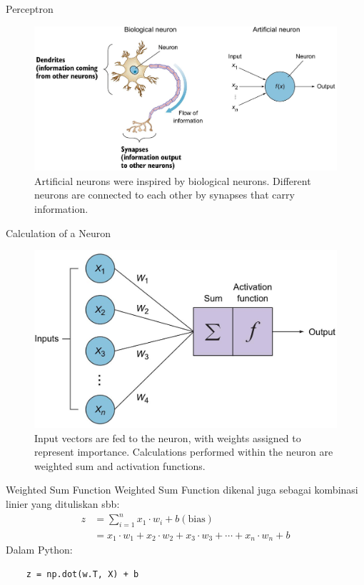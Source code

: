 \documentclass{beamer}
\begin{document}
\begin{frame}{Perceptron}
	\begin{figure}[ht]
		\centering
		\includegraphics[scale=0.2]{images/ann}
		\caption{Artificial neurons were inspired by biological neurons. Different neurons are connected to each other by synapses that carry information.}
	\end{figure}	
\end{frame}

\begin{frame}{Calculation of a Neuron}
	\begin{figure}[ht]
		\centering
		\includegraphics[scale=0.2]{images/calculation-perceptron}
		\caption{Input vectors are fed to the neuron, with weights assigned to represent importance. Calculations performed within the neuron are weighted sum and activation functions.}
	\end{figure}	
\end{frame}

\begin{frame}[fragile]{Weighted Sum Function}
	Weighted Sum Function dikenal juga sebagai kombinasi linier yang dituliskan sbb:
	\begin{align*}
		z &= \sum_{i=1}^n{x_1 \cdot w_i + b (\text{bias})}  \\
		  &= x_1 \cdot w_1 + x_2 \cdot w_2 + x_3 \cdot w_3 + \cdots + x_n \cdot w_n + b
	\end{align*}
	Dalam Python:
	\begin{verbatim}
	z = np.dot(w.T, X) + b
	\end{verbatim}
\end{frame}
\end{document}
